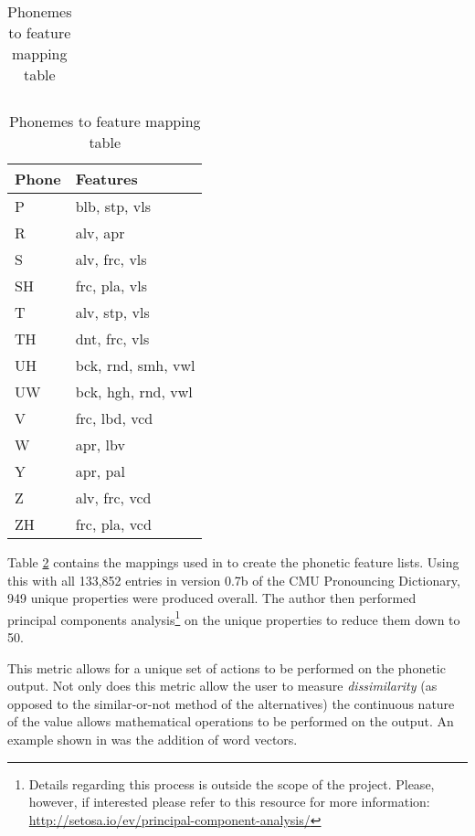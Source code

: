 \begin{table}[!htb]
\begin{minipage}{.33\linewidth}
\begin{tabular}{ll}
        \end{tabular}
    \end{minipage} 
    \begin{minipage}{.33\linewidth}
        \centering
        \begin{tabular}{ll}
            Phone & Features \\
            \hline
            P & blb, stp, vls \\
            R & alv, apr \\
            S & alv, frc, vls \\
            SH & frc, pla, vls \\
            T & alv, stp, vls \\
            TH & dnt, frc, vls \\
            UH & bck, rnd, smh, vwl \\
            UW & bck, hgh, rnd, vwl \\
            V & frc, lbd, vcd \\
            W & apr, lbv \\
            Y & apr, pal \\
            Z & alv, frc, vcd \\
            ZH & frc, pla, vcd \\
        \end{tabular}
    \end{minipage} 
    \caption{Phonemes to feature mapping table}
    \label{tab:features}
\end{table}

Table \ref{tab:features} contains the mappings used in \cite{parrish2017poetic} to create the phonetic feature lists.
Using this with all 133,852 entries in version 0.7b of the CMU Pronouncing Dictionary, 949 unique properties were produced overall. The author then performed principal components analysis\footnote{Details regarding this process is outside the scope of the project. Please, however, if interested please refer to this resource for more information: \url{http://setosa.io/ev/principal-component-analysis/}} on the unique properties to reduce them down to 50.

This metric allows for a unique set of actions to be performed on the phonetic output. Not only does this metric allow the user to measure \textit{dissimilarity} (as opposed to the similar-or-not method of the alternatives) the continuous nature of the value allows mathematical operations to be performed on the output. An example shown in \cite{parrish2017poetic} was the addition of word vectors.

